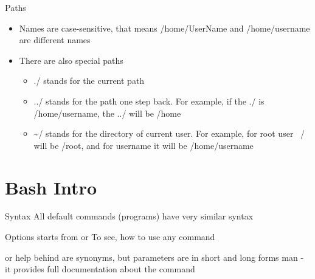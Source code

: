 \documentclass[usenames,dvipsnames,10pt,aspectratio=169]{beamer}
\begin{document}
\begin{frame}{Paths}
    \begin{itemize}
        \item Names are case-sensitive, that means {\color{ucugreen} /home/UserName} and {\color{ucugreen} /home/username} are different names
        \item There are also special paths
        \begin{itemize}
            \item {\color{ucugreen} ./} stands for the current path
            \item {\color{ucugreen} ../} stands for the path one step back. For example, if the {\color{ucugreen} ./} is {\color{ucugreen} /home/username}, the {\color{ucugreen} ../} will be {\color{ucugreen} /home}
            \item {\color{ucugreen} \textasciitilde /} stands for the directory of current user. For example, for {\color{ucugreen} root} user {\color{ucugreen} ~/} will be {\color{ucugreen} /root}, and for {\color{ucugreen} username} it will be {\color{ucugreen} /home/username}
        \end{itemize}
    \end{itemize}
\end{frame}

\section{Bash Intro}

\begin{frame}{Syntax}
    All default commands (programs) have very similar syntax
    \begin{examples}
    \end{examples}
    Options starts from \ex{-} or \ex{-{}-} \newline
    To see, how to use any command
    \begin{examples}
         \newline or
        help \newline behind are synonyms, but parameters are in short and long forms \newline
        man   - it provides full documentation about the command
    \end{examples}
\end{frame}
\end{document}
